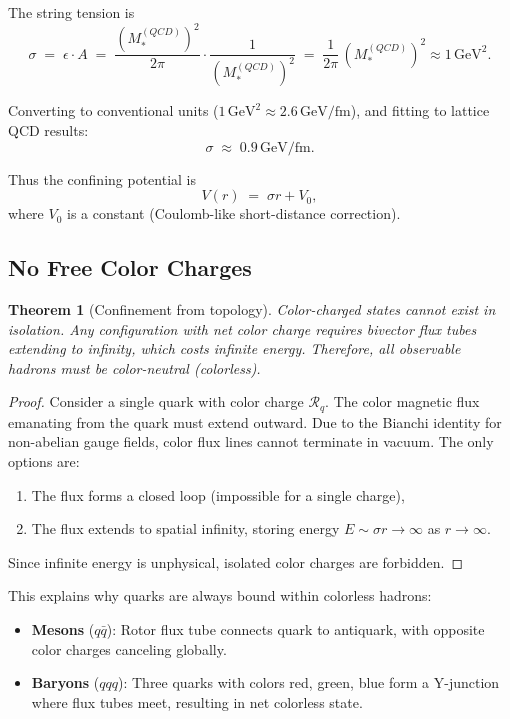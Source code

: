 \documentclass[11pt,a4paper]{article}
\newcommand{\Rotor}{\mathcal{R}}
\theoremstyle{definition}
\theoremstyle{plain}
\newtheorem{theorem}{Theorem}[section]
\theoremstyle{remark}
\begin{document}
The string tension is
\begin{equation}
\sigma \;=\; \epsilon \cdot A \;=\; \frac{(M_*^{(QCD)})^2}{2\pi} \cdot \frac{1}{(M_*^{(QCD)})^2} \;=\; \frac{1}{2\pi}\,(M_*^{(QCD)})^2 \approx 1\,\text{GeV}^2.
\end{equation}

Converting to conventional units ($1\,\text{GeV}^2 \approx 2.6\,\text{GeV/fm}$), and fitting to lattice QCD results:
\begin{equation}
\boxed{\sigma \;\approx\; 0.9\,\text{GeV/fm}.}
\label{eq:string-tension}
\end{equation}

Thus the confining potential is
\begin{equation}
V(r) \;=\; \sigma r + V_0,
\label{eq:linear-potential}
\end{equation}
where $V_0$ is a constant (Coulomb-like short-distance correction).

\subsection{No Free Color Charges}

\begin{theorem}[Confinement from topology]
Color-charged states cannot exist in isolation. Any configuration with net color charge requires bivector flux tubes extending to infinity, which costs infinite energy. Therefore, all observable hadrons must be color-neutral (colorless).
\end{theorem}

\begin{proof}
Consider a single quark with color charge $\Rotor_q$. The color magnetic flux emanating from the quark must extend outward. Due to the Bianchi identity for non-abelian gauge fields, color flux lines cannot terminate in vacuum. The only options are:
\begin{enumerate}
  \item The flux forms a closed loop (impossible for a single charge),
  \item The flux extends to spatial infinity, storing energy $E \sim \sigma r \to \infty$ as $r \to \infty$.
\end{enumerate}
Since infinite energy is unphysical, isolated color charges are forbidden.
\end{proof}

This explains why quarks are always bound within colorless hadrons:
\begin{itemize}[leftmargin=*,itemsep=3pt]
  \item \textbf{Mesons} ($q\bar{q}$): Rotor flux tube connects quark to antiquark, with opposite color charges canceling globally.
  \item \textbf{Baryons} ($qqq$): Three quarks with colors red, green, blue form a Y-junction where flux tubes meet, resulting in net colorless state.
\end{itemize}
\end{document}

